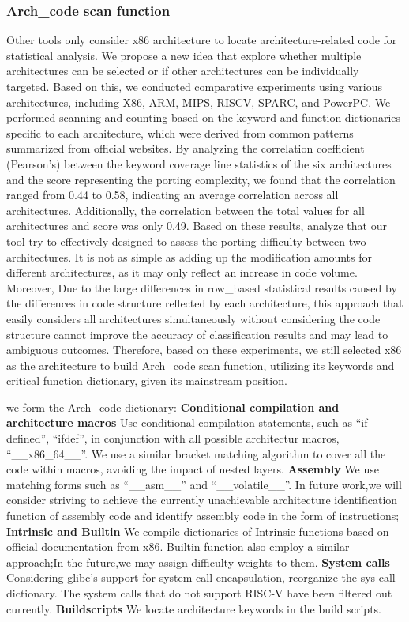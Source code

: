 \documentclass[sigconf,screen,review,anonymous]{acmart}
\begin{document}
\subsubsection{Arch\_code scan function}
Other tools only consider x86 architecture to locate architecture-related code for statistical analysis. We propose a new idea that explore whether multiple architectures can be selected or if other architectures can be individually targeted. Based on this, we conducted comparative experiments using various architectures, including X86, ARM, MIPS, RISCV, SPARC, and PowerPC. We performed scanning and counting based on the keyword and function dictionaries specific to each architecture, which were derived from common patterns summarized from official websites.
By analyzing the correlation coefficient (Pearson's) between the keyword coverage line statistics of the six architectures and the score representing the porting complexity, we found that the correlation ranged from 0.44 to 0.58, indicating an average correlation across all architectures. Additionally, the correlation between the total values for all architectures and score was only 0.49.
Based on these results, analyze that our tool try to effectively designed to assess the porting difficulty between two architectures. It is not as simple as adding up the modification amounts for different architectures, as it may only reflect an increase in code volume. Moreover, Due to the large differences in row\_based statistical results caused by the differences in code structure reflected by each architecture, this approach that easily considers all architectures simultaneously without considering the code structure cannot improve the accuracy of classification results and may lead to ambiguous outcomes. Therefore, based on these experiments, we still selected x86 as the architecture to build Arch\_code scan function, utilizing its keywords and critical function dictionary, given its mainstream position.

we form the Arch\_code dictionary:
\textbf{Conditional compilation and architecture macros} Use conditional compilation statements, such as ``if defined'', ``ifdef'', in conjunction with all possible architectur macros,
  ``\_\_x86\_64\_\_''.
  We use a similar bracket matching algorithm to cover all the code within macros, avoiding the impact of nested layers.
  \textbf{Assembly} We use matching forms such as ``\_\_asm\_\_'' and ``\_\_volatile\_\_''.
  In future work,we will consider striving to achieve the currently unachievable architecture identification function of assembly code and identify assembly code in the form of instructions;
  \textbf{Intrinsic and Builtin} 
  We compile dictionaries of Intrinsic functions based on official documentation from x86\cite{x86intrin}.
  Builtin function also employ a similar approach;In the future,we may assign difficulty weights to them.
  \textbf{System calls} Considering glibc's support for system call encapsulation, reorganize the sys-call dictionary.
  The system calls that do not support RISC-V have been filtered out currently.
  \textbf{Buildscripts} We locate architecture keywords in the build scripts.
 
\end{document}
